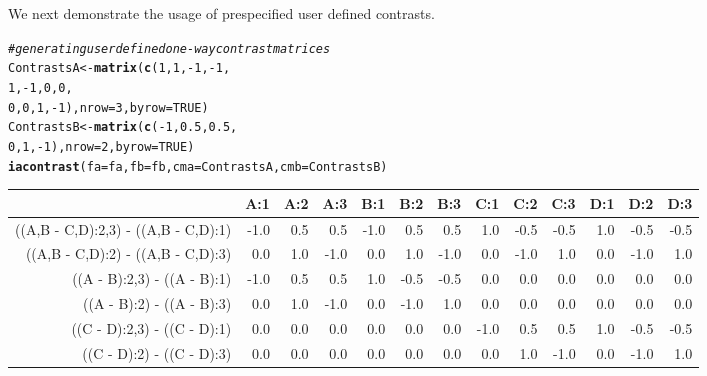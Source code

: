 \documentclass[12pt]{article}\usepackage[]{graphicx}\usepackage[]{color}
\makeatletter
\newcommand{\hlnum}[1]{\textcolor[rgb]{0.686,0.059,0.569}{#1}}%
\newcommand{\hlcom}[1]{\textcolor[rgb]{0.678,0.584,0.686}{\textit{#1}}}%
\newcommand{\hlopt}[1]{\textcolor[rgb]{0,0,0}{#1}}%
\newcommand{\hlstd}[1]{\textcolor[rgb]{0.345,0.345,0.345}{#1}}%
\newcommand{\hlkwb}[1]{\textcolor[rgb]{0.69,0.353,0.396}{#1}}%
\newcommand{\hlkwc}[1]{\textcolor[rgb]{0.333,0.667,0.333}{#1}}%
\newcommand{\hlkwd}[1]{\textcolor[rgb]{0.737,0.353,0.396}{\textbf{#1}}}%
\newenvironment{kframe}{%
 \def\at@end@of@kframe{}%
 \ifinner\ifhmode%
  \def\at@end@of@kframe{\end{minipage}}%
  \begin{minipage}{\columnwidth}%
 \fi\fi%
 \def\FrameCommand##1{\hskip\@totalleftmargin \hskip-\fboxsep
 \colorbox{shadecolor}{##1}\hskip-\fboxsep
     \hskip-\linewidth \hskip-\@totalleftmargin \hskip\columnwidth}%
 \MakeFramed {\advance\hsize-\width
   \@totalleftmargin\z@ \linewidth\hsize
   \@setminipage}}%
 {\par\unskip\endMakeFramed%
 \at@end@of@kframe}
\newenvironment{knitrout}{}{} %
\makeatother
\begin{document}
We next demonstrate the usage of prespecified user defined contrasts.
\begin{knitrout}
\color{fgcolor}\begin{kframe}
\begin{alltt}
\hlcom{#generating user defined one-way contrast matrices}
\hlstd{ContrastsA} \hlkwb{<-} \hlkwd{matrix}\hlstd{(}\hlkwd{c}\hlstd{(}\hlnum{1} \hlstd{,} \hlnum{1}\hlstd{,} \hlopt{-}\hlnum{1}\hlstd{,} \hlopt{-}\hlnum{1}\hlstd{,}
                       \hlnum{1} \hlstd{,}\hlopt{-}\hlnum{1}\hlstd{,}  \hlnum{0}\hlstd{,}  \hlnum{0}\hlstd{,}
                       \hlnum{0} \hlstd{,} \hlnum{0}\hlstd{,}  \hlnum{1}\hlstd{,} \hlopt{-}\hlnum{1}\hlstd{),} \hlkwc{nrow}\hlstd{=}\hlnum{3}\hlstd{,} \hlkwc{byrow}\hlstd{=}\hlnum{TRUE}\hlstd{)}
\hlstd{ContrastsB} \hlkwb{<-} \hlkwd{matrix}\hlstd{(}\hlkwd{c}\hlstd{(}\hlopt{-}\hlnum{1}\hlstd{,} \hlnum{0.5}\hlstd{,} \hlnum{0.5}\hlstd{,}
                        \hlnum{0}\hlstd{,}   \hlnum{1}\hlstd{,}  \hlopt{-}\hlnum{1}\hlstd{),} \hlkwc{nrow}\hlstd{=}\hlnum{2}\hlstd{,} \hlkwc{byrow}\hlstd{=}\hlnum{TRUE}\hlstd{)}
\hlkwd{iacontrast}\hlstd{(}\hlkwc{fa}\hlstd{=fa,} \hlkwc{fb}\hlstd{=fb,} \hlkwc{cma}\hlstd{=ContrastsA,} \hlkwc{cmb}\hlstd{=ContrastsB)}
\end{alltt}
\end{kframe}
\end{knitrout}


\tiny
\begin{table}[ht]
\centering
{\scriptsize
\begin{tabular}{rrrrrrrrrrrrr}
  \hline
 & A:1 & A:2 & A:3 & B:1 & B:2 & B:3 & C:1 & C:2 & C:3 & D:1 & D:2 & D:3 \\ 
  \hline
((A,B - C,D):2,3) - ((A,B - C,D):1) & -1.0 & 0.5 & 0.5 & -1.0 & 0.5 & 0.5 & 1.0 & -0.5 & -0.5 & 1.0 & -0.5 & -0.5 \\ 
  ((A,B - C,D):2) - ((A,B - C,D):3) & 0.0 & 1.0 & -1.0 & 0.0 & 1.0 & -1.0 & 0.0 & -1.0 & 1.0 & 0.0 & -1.0 & 1.0 \\ 
  ((A - B):2,3) - ((A - B):1) & -1.0 & 0.5 & 0.5 & 1.0 & -0.5 & -0.5 & 0.0 & 0.0 & 0.0 & 0.0 & 0.0 & 0.0 \\ 
  ((A - B):2) - ((A - B):3) & 0.0 & 1.0 & -1.0 & 0.0 & -1.0 & 1.0 & 0.0 & 0.0 & 0.0 & 0.0 & 0.0 & 0.0 \\ 
  ((C - D):2,3) - ((C - D):1) & 0.0 & 0.0 & 0.0 & 0.0 & 0.0 & 0.0 & -1.0 & 0.5 & 0.5 & 1.0 & -0.5 & -0.5 \\ 
  ((C - D):2) - ((C - D):3) & 0.0 & 0.0 & 0.0 & 0.0 & 0.0 & 0.0 & 0.0 & 1.0 & -1.0 & 0.0 & -1.0 & 1.0 \\ 
   \hline
\end{tabular}
}
\end{table}
\end{document}
